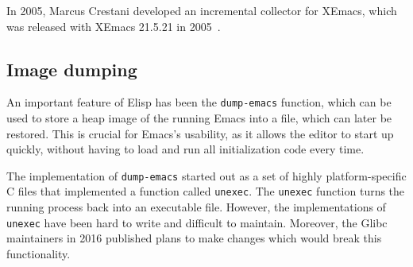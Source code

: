 \documentclass[format=acmsmall, review=false, screen=true]{acmart}
\newcommand \Elisp {Elisp}
\begin{document}
\label{sec:incremental-gc}
In 2005, Marcus Crestani developed an incremental collector for
XEmacs, which was released with XEmacs 21.5.21 in
2005~\cite{Crestani2005}.


\subsection{Image dumping}
\label{sec:image-dumping}

An important feature of \Elisp{} has been the \texttt{dump-emacs}
function, which can be used to store a heap image of the running Emacs
into a file, which can later be restored.  This is crucial for Emacs's
usability, as it allows the editor to start up quickly, without
having to load and run all initialization code every time.

The implementation of \texttt{dump-emacs} started out as a set of
highly platform-specific C files that implemented a function called
\texttt{unexec}.  The \texttt{unexec} function turns the running
process back into an executable file.  However, the implementations of
\texttt{unexec} have been hard to write and difficult to maintain.
Moreover, the Glibc maintainers in 2016 published plans to
make changes which would break this functionality.
\end{document}
